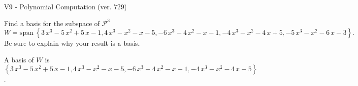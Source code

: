 \begin{exercise}
  \begin{exerciseTitle}V9 - Polynomial Computation (ver. 729)\end{exerciseTitle}
  \begin{exerciseStatement}
    Find a basis for the subspace of \(\mathcal{P}^3\) 
\[W=\mathrm{span}\ \left\{3 \, x^{3} - 5 \, x^{2} + 5 \, x - 1 , 4 \, x^{3} - x^{2} - x - 5 , -6 \, x^{3} - 4 \, x^{2} - x - 1 , -4 \, x^{3} - x^{2} - 4 \, x + 5 , -5 \, x^{3} - x^{2} - 6 \, x - 3\right\}.\]
 Be sure to explain why your result is a basis.


  \end{exerciseStatement}
  \begin{exerciseAnswer}
   A basis of \(W\) is  \(\left\{3 \, x^{3} - 5 \, x^{2} + 5 \, x - 1 , 4 \, x^{3} - x^{2} - x - 5 , -6 \, x^{3} - 4 \, x^{2} - x - 1 , -4 \, x^{3} - x^{2} - 4 \, x + 5\right\}\).
  


  \end{exerciseAnswer}
\end{exercise}